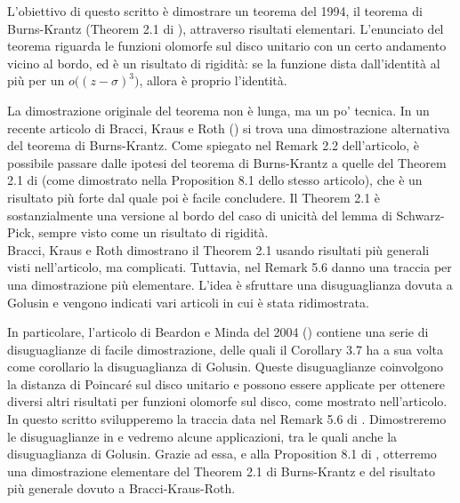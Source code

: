 L'obiettivo di questo scritto è dimostrare un teorema del 1994, il teorema di Burns-Krantz (Theorem 2.1 di \cite{BK}), attraverso risultati elementari. L'enunciato del teorema riguarda le funzioni olomorfe sul disco unitario con un certo andamento vicino al bordo, ed è un risultato di rigidità: se la funzione dista dall'identità al più per un $o\bigl((z-\sigma)^3\bigr)$, allora è proprio l'identità.

La dimostrazione originale del teorema non è lunga, ma un po' tecnica. In un recente articolo di Bracci, Kraus e Roth (\cite{BKR}) si trova una dimostrazione alternativa del teorema di Burns-Krantz. Come spiegato nel Remark 2.2 dell'articolo, è possibile passare dalle ipotesi del teorema di Burns-Krantz a quelle del Theorem 2.1 di \cite{BKR} (come dimostrato nella Proposition 8.1 dello stesso articolo), che è un risultato più forte dal quale poi è facile concludere. Il Theorem 2.1 è sostanzialmente una versione al bordo del caso di unicità del lemma di Schwarz-Pick, sempre visto come un risultato di rigidità. \\

Bracci, Kraus e Roth dimostrano il Theorem 2.1 usando risultati più generali visti nell'articolo, ma complicati. Tuttavia, nel Remark 5.6 danno una traccia per una dimostrazione più elementare. L'idea è sfruttare una disuguaglianza dovuta a Golusin e vengono indicati vari articoli in cui è stata ridimostrata.

In particolare, l'articolo di Beardon e Minda del 2004 (\cite{BM}) contiene una serie di disuguaglianze di facile dimostrazione, delle quali il Corollary 3.7 ha a sua volta come corollario la disuguaglianza di Golusin. Queste disuguaglianze coinvolgono la distanza di Poincaré sul disco unitario e possono essere applicate per ottenere diversi altri risultati per funzioni olomorfe sul disco, come mostrato nell'articolo. \\

In questo scritto svilupperemo la traccia data nel Remark 5.6 di \cite{BKR}. Dimostreremo le disuguaglianze in \cite{BM} e vedremo alcune applicazioni, tra le quali anche la disuguaglianza di Golusin. Grazie ad essa, e alla Proposition 8.1 di \cite{BKR}, otterremo una dimostrazione elementare del Theorem 2.1 di Burns-Krantz e del risultato più generale dovuto a Bracci-Kraus-Roth.
